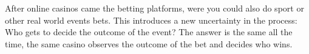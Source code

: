 \begin{intro}
After online casinos came the betting platforms, were you could also do sport
  or other real world events bets. This introduces a new uncertainty in the
  process: Who gets to decide the outcome of the event? The answer is the same
  all the time, the same casino observes the outcome of the bet and decides
  who wins.
  
  
  

 
 




\end{intro}
